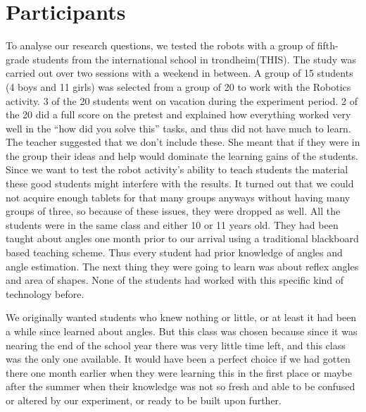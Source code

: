 \chapter{Participants}
To analyse our research questions, we tested the robots with a group of fifth-grade students from the international school in trondheim(THIS). The study was carried out over two sessions with a weekend in between. A group of 15 students (4 boys and 11 girls) was selected from a group of 20 to work with the Robotics activity. 3 of the 20 students went on vacation during the experiment period. 2 of the 20 did a full score on the pretest and explained how everything worked very well in the "`how did you solve this"' tasks, and thus did not have much to learn. The teacher suggested that we don't include these. She meant that if they were in the group their ideas and help would dominate the learning gains of the students. Since we want to test the robot activity's ability to teach students the material these good students might interfere with the results. It turned out that we could not acquire enough tablets for that many groups anyways without having many groups of three, so because of these issues, they were dropped as well. All the students were in the same class and either 10 or 11 years old. They had been taught about angles one month prior to our arrival using a traditional blackboard based teaching scheme. Thus every student had prior knowledge of angles and angle estimation. The next thing they were going to learn was about reflex angles and area of shapes. None of the students had worked with this specific kind of technology before.  

\bigskip\noindent
We originally wanted students who knew nothing or little, or at least it had been a while since learned about angles. But this class was chosen because since it was nearing the end of the school year there was very little time left, and this class was the only one available. It would have been a perfect choice if we had gotten there one month earlier when they were learning this in the first place or maybe after the summer when their knowledge was not so fresh and able to be confused or altered by our experiment, or ready to be built upon further. 